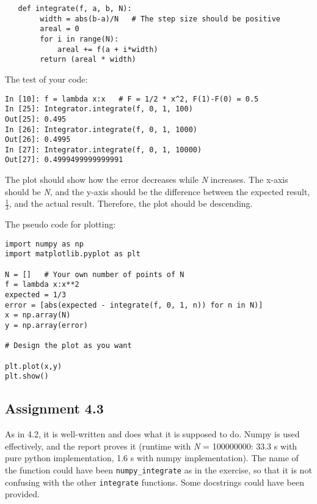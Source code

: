 \documentclass[a4paper]{article}
\begin{document}
\begin{verbatim}
   def integrate(f, a, b, N):
        width = abs(b-a)/N   # The step size should be positive
        areal = 0
        for i in range(N):
            areal += f(a + i*width)
        return (areal * width)
\end{verbatim}

The test of your code:
\begin{verbatim}
In [10]: f = lambda x:x	  # F = 1/2 * x^2, F(1)-F(0) = 0.5
In [25]: Integrator.integrate(f, 0, 1, 100)
Out[25]: 0.495
In [26]: Integrator.integrate(f, 0, 1, 1000)
Out[26]: 0.4995
In [27]: Integrator.integrate(f, 0, 1, 10000)
Out[27]: 0.4999499999999991
\end{verbatim}

The plot should show how the error decreases while \textit{N} increases. The x-axis should be \textit{N}, and the y-axis should be the difference between the expected result, \(\frac{1}{3}\), and the actual result. Therefore, the plot should be descending.

The pseudo code for plotting:
\begin{verbatim}
import numpy as np
import matplotlib.pyplot as plt 

N = []   # Your own number of points of N
f = lambda x:x**2
expected = 1/3
error = [abs(expected - integrate(f, 0, 1, n)) for n in N)]
x = np.array(N)
y = np.array(error)

# Design the plot as you want

plt.plot(x,y)
plt.show()
\end{verbatim}

\subsection*{Assignment 4.3}

As in 4.2, it is well-written and does what it is supposed to do. Numpy is used effectively, and the report proves it (runtime with \textit{N} = 100000000: 33.3 s with pure python implementation, 1.6 s with numpy implementation). The name of the function could have been \texttt{numpy\_integrate} as in the exercise, so that it is not confusing with the other \texttt{integrate} functions. Some docstrings could have been provided.
\end{document}
